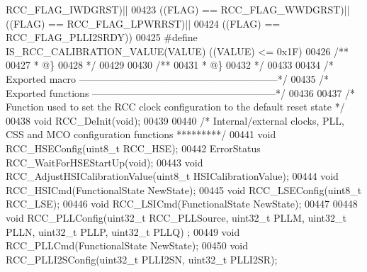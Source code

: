 \begin{DoxyCode}
      RCC_FLAG_IWDGRST\textcolor{preprocessor}{)}\textcolor{preprocessor}{||}
00423                            \textcolor{preprocessor}{(}\textcolor{preprocessor}{(}\textcolor{preprocessor}{FLAG}\textcolor{preprocessor}{)} \textcolor{preprocessor}{==} RCC_FLAG_WWDGRST\textcolor{preprocessor}{)}\textcolor{preprocessor}{||} \textcolor{preprocessor}{(}\textcolor{preprocessor}{(}\textcolor{preprocessor}{FLAG}\textcolor{preprocessor}{)} \textcolor{preprocessor}{==} 
      RCC_FLAG_LPWRRST\textcolor{preprocessor}{)}\textcolor{preprocessor}{||}
00424                            \textcolor{preprocessor}{(}\textcolor{preprocessor}{(}\textcolor{preprocessor}{FLAG}\textcolor{preprocessor}{)} \textcolor{preprocessor}{==} RCC_FLAG_PLLI2SRDY\textcolor{preprocessor}{)}\textcolor{preprocessor}{)}
00425 \textcolor{preprocessor}{#}\textcolor{preprocessor}{define} \textcolor{preprocessor}{IS\_RCC\_CALIBRATION\_VALUE}\textcolor{preprocessor}{(}\textcolor{preprocessor}{VALUE}\textcolor{preprocessor}{)} \textcolor{preprocessor}{(}\textcolor{preprocessor}{(}\textcolor{preprocessor}{VALUE}\textcolor{preprocessor}{)} \textcolor{preprocessor}{<=} 0x1F\textcolor{preprocessor}{)}
00426 \textcolor{comment}{/**}
00427 \textcolor{comment}{  * @\}}
00428 \textcolor{comment}{  */}
00429 
00430 \textcolor{comment}{/**}
00431 \textcolor{comment}{  * @\}}
00432 \textcolor{comment}{  */}
00433 
00434 \textcolor{comment}{/* Exported macro ------------------------------------------------------------*/}
00435 \textcolor{comment}{/* Exported functions --------------------------------------------------------*/}
00436 
00437 \textcolor{comment}{/* Function used to set the RCC clock configuration to the default reset state */}
00438 \textcolor{keywordtype}{void} RCC_DeInit(\textcolor{keywordtype}{void});
00439 
00440 \textcolor{comment}{/* Internal/external clocks, PLL, CSS and MCO configuration functions *********/}
00441 \textcolor{keywordtype}{void} RCC_HSEConfig(uint8\_t RCC\_HSE);
00442 ErrorStatus RCC_WaitForHSEStartUp(\textcolor{keywordtype}{void});
00443 \textcolor{keywordtype}{void} RCC_AdjustHSICalibrationValue(uint8\_t HSICalibrationValue);
00444 \textcolor{keywordtype}{void} RCC_HSICmd(FunctionalState NewState);
00445 \textcolor{keywordtype}{void} RCC_LSEConfig(uint8\_t RCC\_LSE);
00446 \textcolor{keywordtype}{void} RCC_LSICmd(FunctionalState NewState);
00447 
00448 \textcolor{keywordtype}{void} RCC_PLLConfig(uint32\_t RCC\_PLLSource, uint32\_t PLLM, uint32\_t PLLN, uint32\_t PLLP, uint32\_t PLLQ)
      ;
00449 \textcolor{keywordtype}{void} RCC_PLLCmd(FunctionalState NewState);
00450 \textcolor{keywordtype}{void} RCC_PLLI2SConfig(uint32\_t PLLI2SN, uint32\_t PLLI2SR);

\end{DoxyCode}
